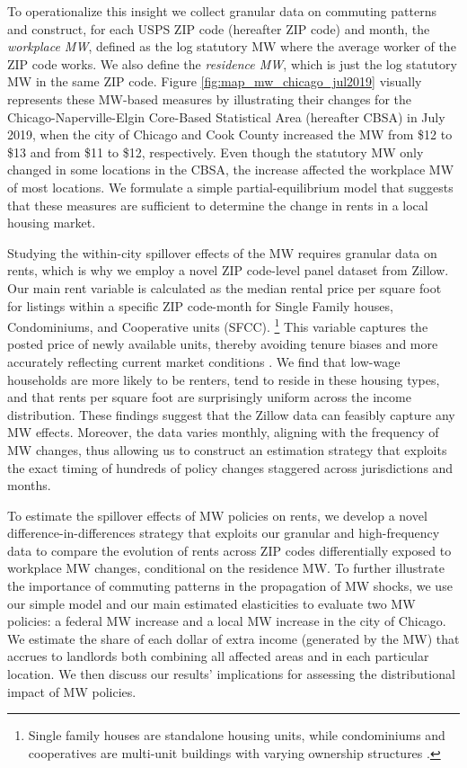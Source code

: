 To operationalize this insight we collect granular data on commuting patterns 
and construct, for each USPS ZIP code (hereafter ZIP code) and month,
the \textit{workplace MW}, defined as the log statutory MW where
the average worker of the ZIP code works.
We also define the \textit{residence MW}, which is just the log statutory MW in 
the same ZIP code.
Figure \ref{fig:map_mw_chicago_jul2019} visually represents these MW-based 
measures by illustrating their changes for the Chicago-Naperville-Elgin 
Core-Based Statistical Area (hereafter CBSA) in July 2019,
when the city of Chicago and Cook County increased the MW from \$12 to \$13 and 
from \$11 to \$12, respectively.
Even though the statutory MW only changed in some locations in the CBSA, the 
increase affected the workplace MW of most locations.
We formulate a simple partial-equilibrium model that suggests that these 
measures are sufficient to determine the change in rents in a 
local housing market.

Studying the within-city spillover effects of the MW requires granular data on 
rents, which is why we employ a novel ZIP code-level panel dataset from Zillow.
Our main rent variable is calculated as the median rental price per square foot 
for listings within a specific ZIP code-month for Single Family houses, 
Condominiums, and Cooperative units (SFCC).%
\footnote{Single family houses are standalone housing units, while condominiums 
    and cooperatives are multi-unit buildings with varying ownership structures 
    \parencite{ZillowTypesOfHomes}.}
This variable captures the posted price of newly available units, 
thereby avoiding tenure biases and more accurately reflecting current market 
conditions \parencite{AmbroseEtAl2015}.
We find that low-wage households are more likely to be renters,
tend to reside in these housing types,
and that rents per square foot are surprisingly uniform across the income 
distribution.
These findings suggest that the Zillow data can feasibly capture any MW effects.
Moreover, the data varies monthly, aligning with the frequency of MW 
changes, thus allowing us to construct an estimation strategy that exploits the 
exact timing of hundreds of policy changes staggered across jurisdictions and 
months.

To estimate the spillover effects of MW policies on rents, we develop a novel 
difference-in-differences strategy that exploits our granular and high-frequency 
data to compare the evolution of rents across ZIP codes differentially exposed 
to workplace MW changes, conditional on the residence MW.
To further illustrate the importance of commuting patterns in the propagation 
of MW shocks, we use our simple model and our main estimated elasticities to 
evaluate two MW policies: 
a federal MW increase and
a local MW increase in the city of Chicago.
We estimate the share of each dollar of extra income (generated by the MW) that 
accrues to landlords both combining all affected areas and in each particular 
location.
We then discuss our results' implications for assessing the distributional 
impact of MW policies.

